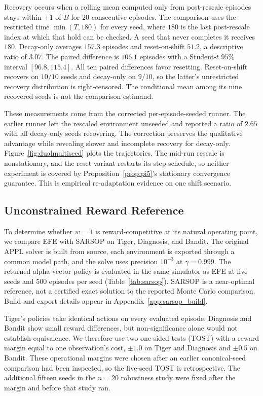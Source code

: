 Recovery occurs when a rolling mean computed only from post-rescale episodes stays within $\pm1$ of $B$ for $20$ consecutive episodes. The comparison uses the restricted time $\min(T,180)$ for every seed, where $180$ is the last post-rescale index at which that hold can be checked. A seed that never completes it receives $180$. Decay-only averages $157.3$ episodes and reset-on-shift $51.2$, a descriptive ratio of $3.07$. The paired difference is $106.1$ episodes with a Student-$t$ $95\%$ interval $[96.8,115.4]$. All ten paired differences favor resetting. Reset-on-shift recovers on $10/10$ seeds and decay-only on $9/10$, so the latter's unrestricted recovery distribution is right-censored. The conditional mean among its nine recovered seeds is not the comparison estimand.

These measurements come from the corrected per-episode-seeded runner. The earlier runner left the rescaled environment unseeded and reported a ratio of $2.65$ with all decay-only seeds recovering. The correction preserves the qualitative advantage while revealing slower and incomplete recovery for decay-only. Figure~\ref{fig:dualmultiseed} plots the trajectories. The mid-run rescale is nonstationary, and the reset variant restarts its step schedule, so neither experiment is covered by Proposition~\ref{prop:pi5}'s stationary convergence guarantee. This is empirical re-adaptation evidence on one shift scenario.


\subsection{Unconstrained Reward Reference}
\label{sec:sarsop}

To determine whether $w{=}1$ is reward-competitive at its natural operating point, we compare EFE with SARSOP \citep{kurniawati2008} on Tiger, Diagnosis, and Bandit. The original APPL solver is built from source, each environment is exported through a common model path, and the solve uses precision $10^{-3}$ at $\gamma{=}0.999$. The returned alpha-vector policy is evaluated in the same simulator as EFE at five seeds and $500$ episodes per seed (Table~\ref{tab:sarsop}). SARSOP is a near-optimal reference, not a certified exact solution to the reported Monte Carlo comparison. Build and export details appear in Appendix~\ref{app:sarsop_build}.


Tiger's policies take identical actions on every evaluated episode. Diagnosis and Bandit show small reward differences, but non-significance alone would not establish equivalence. We therefore use two one-sided tests (TOST) \citep{schuirmann1987} with a reward margin equal to one observation's cost, $\pm1.0$ on Tiger and Diagnosis and $\pm0.5$ on Bandit. These operational margins were chosen after an earlier canonical-seed comparison had been inspected, so the five-seed TOST is retrospective. The additional fifteen seeds in the $n{=}20$ robustness study were fixed after the margin and before that study ran.

